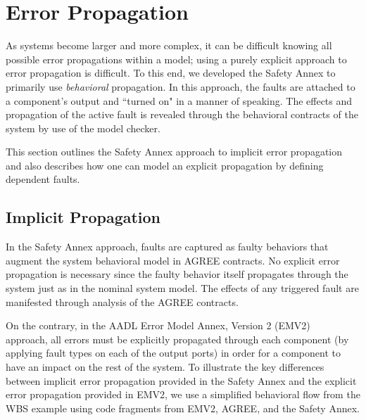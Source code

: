 \section{Error Propagation}
As systems become larger and more complex, it can be difficult knowing all possible error propagations within a model; using a purely explicit approach to error propagation is difficult. To this end, we developed the Safety Annex to primarily use \textit{behavioral} propagation. In this approach, the faults are attached to a component's output and ``turned on" in a manner of speaking. The effects and propagation of the active fault is revealed through the behavioral contracts of the system by use of the model checker. 

This section outlines the Safety Annex approach to implicit error propagation and also describes how one can model an explicit propagation by defining dependent faults. 

\subsection{Implicit Propagation}
In the Safety Annex approach, faults are captured as faulty behaviors that augment the system behavioral model in AGREE contracts. No explicit %
error propagation is necessary since the faulty behavior itself propagates through the system just as in the nominal system model. The effects of any triggered fault are manifested through analysis of the AGREE contracts. 

On the contrary, in the AADL Error Model Annex, Version 2 (EMV2)~\cite{EMV2} approach, all errors must be explicitly propagated through each component (by applying fault types on each of the output ports) in order for a component to have an impact on the rest of the system. To illustrate the key differences between implicit %
error propagation provided in the Safety Annex and the explicit %
error propagation provided in EMV2, we use a simplified behavioral flow from the WBS example using code fragments from EMV2, AGREE, and the Safety Annex. 

